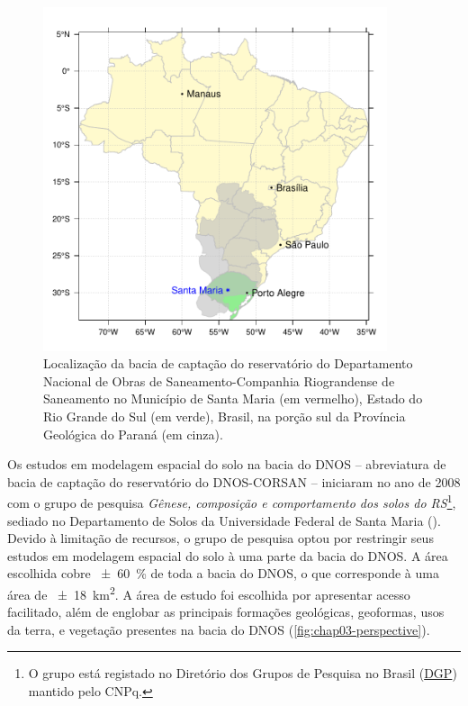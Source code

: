 \begin{figure}[!ht]
\centering
\includegraphics[width=0.90\textwidth]{fig/chap03-location}
\caption[Localização da bacia de captação do reservatório do DNOS-CORSAN, em Santa Maria, RS, 
Brasil]{Localização da bacia de captação do reservatório do Departamento Nacional de Obras de 
Saneamento-Companhia Riograndense de Saneamento no Município de Santa Maria (em vermelho), Estado do Rio 
Grande do Sul (em verde), Brasil, na porção sul da Província Geológica do Paraná (em cinza).}
\label{fig:chap03-location}
\end{figure}

\def\footsolosdors{\footnote{O grupo está registado no Diretório dos Grupos de Pesquisa no Brasil 
(\href{http://dgp.cnpq.br/dgp/espelhogrupo/9373361709890764}{DGP}) mantido pelo CNPq.}}

Os estudos em modelagem espacial do solo na bacia do DNOS -- abreviatura de bacia de captação do reservatório 
do DNOS-CORSAN -- iniciaram no ano de \num{2008} com o grupo de pesquisa \emph{Gênese, composição e 
comportamento dos solos do RS}\footsolosdors{}, sediado no Departamento de Solos da Universidade Federal de 
Santa Maria (\ufsm). Devido à limitação de recursos, o grupo de pesquisa optou por restringir seus estudos em 
modelagem espacial do solo à uma parte da bacia do DNOS. A área escolhida cobre \SI{\pm60}{\percent} de toda a 
bacia do DNOS, o que corresponde à uma área de \SI{\pm18}{\square\kilo\metre}. A área de estudo foi escolhida 
por apresentar acesso facilitado, além de englobar as principais formações geológicas, geoformas, usos da 
terra, e vegetação presentes na bacia do DNOS (\autoref{fig:chap03-perspective}).

